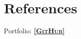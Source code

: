 \documentclass[11pt,a4paper,sans,colorlinks,linkcolor=blue,urlcolor=blue]{moderncv}
\begin{document}
\section{References}
Portfolio: \underline{\href{https://github.com/jacobpihl}{\textbf{\textsc{[GitHub]}}}}\\

\end{document}
